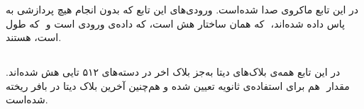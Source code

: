 در این تابع ماکروی\hyperref[subsec:skein-big-core]{} صدا شده‌است. ورودی‌های این تابع که بدون انجام هیچ پردازشی به \hyperref[subsec:skein-big-core]{} پاس داده‌ شده‌اند،‌ ‌ که همان ساختار هش است،  که داده‌ی ورودی است و ‌ که طول   است، هستند.


\subsection{}
\label{subsec:skein-big-core}

در این تابع  همه‌ی بلاک‌های دیتا به‌جز بلاک اخر در دسته‌های ۵۱۲ تایی هش شده‌اند. مقدار ‌ هم برای استفاده‌ی ثانویه تعیین شده و هم‌چنین آخرین بلاک دیتا در بافر ریخته‌ شده‌است. \\


